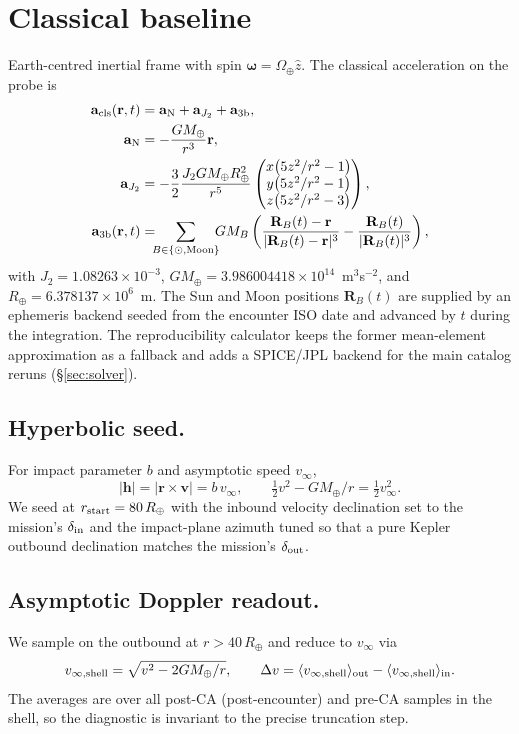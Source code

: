 \documentclass[11pt]{amsart}
\begin{document}
\section{Classical baseline}\label{sec:classical}

Earth-centred inertial frame with spin $\boldsymbol\omega=\Omega_\oplus\hat z$.
The classical acceleration on the probe is
\begin{align}
\mathbf a_{\rm cls}(\mathbf r,t) &= \mathbf a_{\rm N}+\mathbf a_{J_2}+\mathbf a_{3{\rm b}},\\
\mathbf a_{\rm N} &= -\frac{GM_\oplus}{r^3}\mathbf r,\\
\mathbf a_{J_2} &= -\frac{3}{2}\frac{J_2 GM_\oplus R_\oplus^2}{r^5}
  \begin{pmatrix} x\bigl(5z^2/r^2-1\bigr) \\ y\bigl(5z^2/r^2-1\bigr) \\
    z\bigl(5z^2/r^2-3\bigr) \end{pmatrix},\\
\mathbf a_{3{\rm b}}(\mathbf r,t) &= \!\!\!\sum_{B\in\{\odot,\mathrm{Moon}\}}\!\!\! GM_B
  \left(\frac{\mathbf R_B(t)-\mathbf r}{|\mathbf R_B(t)-\mathbf r|^3}
    -\frac{\mathbf R_B(t)}{|\mathbf R_B(t)|^3}\right),
\end{align}
with $J_2=1.08263\times 10^{-3}$, $GM_\oplus=3.986004418\times 10^{14}$~m$^3$s$^{-2}$, and
$R_\oplus=6.378137\times 10^6$~m. The Sun and Moon positions $\mathbf R_B(t)$ are supplied by
an ephemeris backend seeded from the encounter ISO date and advanced by $t$ during the
integration. The reproducibility calculator keeps the former mean-element approximation as a
fallback and adds a SPICE/JPL backend for the main catalog reruns (\S\ref{sec:solver}).

\subsection*{Hyperbolic seed.}
For impact parameter $b$ and asymptotic speed $v_\infty$,
\[
|\mathbf h|=|\mathbf r\times\mathbf v|=b\,v_\infty,\qquad
\tfrac{1}{2}v^2-GM_\oplus/r = \tfrac{1}{2}v_\infty^2 .
\]
We seed at $r_{\rm start}=80\,R_\oplus$ with the inbound velocity declination set to the
mission's $\delta_{\rm in}$ and the impact-plane azimuth tuned so that a pure Kepler outbound
declination matches the mission's $\delta_{\rm out}$.

\subsection*{Asymptotic Doppler readout.}
We sample on the outbound at $r>40\,R_\oplus$ and reduce to $v_\infty$ via
\[
v_{\infty,{\rm shell}}=\sqrt{v^2-2GM_\oplus/r},\qquad
\Delta v = \langle v_{\infty,{\rm shell}}\rangle_{\rm out}
        - \langle v_{\infty,{\rm shell}}\rangle_{\rm in}.
\]
The averages are over all post-CA (post-encounter) and pre-CA samples in the shell, so the
diagnostic is invariant to the precise truncation step.
\end{document}

